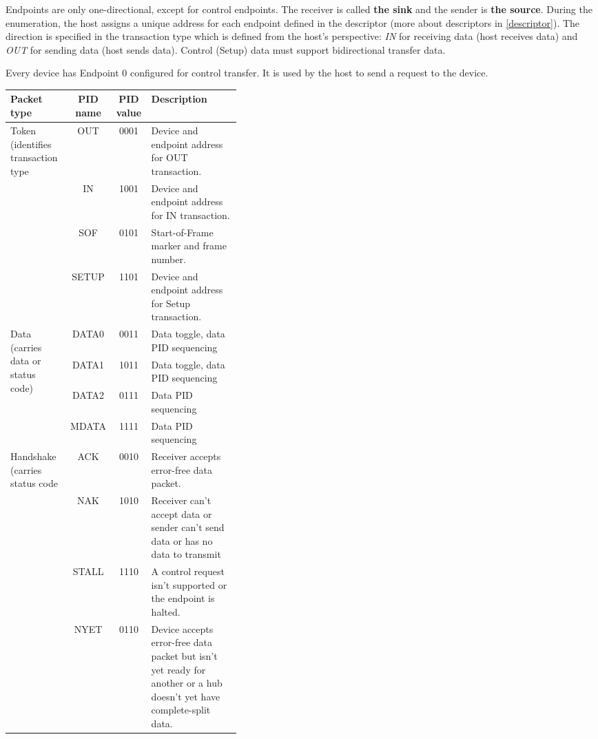 Endpoints are only one-directional, except for control endpoints. The receiver is called \textbf{the sink} and the sender is \textbf{the source}. During the enumeration, the host assigns a unique address for each endpoint defined in the descriptor (more about descriptors in \autoref{descriptor}). The direction is specified in the transaction type which is defined from the host's perspective: \emph{IN} for receiving data (host receives data) and \emph{OUT} for sending data (host sends data). Control (Setup) data must support bidirectional transfer data.

Every device has Endpoint 0 configured for control transfer. It is used by the host to send a request to the device.

\newpage
\begin{table}[ht]
    \centering
    \begin{tabular}{|l|c|c|p{0.39\linewidth}|} \hline
         \textbf{Packet type} & \textbf{PID name} & \textbf{PID value} & \textbf{Description} \\ \hline
         \multirow{4}{3cm}{Token (identifies transaction type} & OUT & 0001 & Device and endpoint address for OUT transaction. \\ \cline {2-4}
           & IN & 1001 & Device and endpoint address for IN transaction. \\ \cline{2-4}
           & SOF & 0101 & Start-of-Frame marker and frame number. \\ \cline{2-4}
           & SETUP & 1101 & Device and endpoint address for Setup transaction. \\ \hline
         \multirow{4}{3cm}{Data (carries data or status code)} & DATA0 & 0011 & Data toggle, data PID sequencing \\ \cline{2-4}
           & DATA1 & 1011 & Data toggle, data PID sequencing \\ \cline{2-4}
           & DATA2 & 0111 & Data PID sequencing \\ \cline{2-4}
           & MDATA & 1111 & Data PID sequencing \\ \hline
         \multirow{4}{3cm}{Handshake (carries status code} & ACK & 0010 & Receiver accepts error-free data packet. \\ \cline{2-4}
           & NAK & 1010 & Receiver can't accept data or sender can't send data or has no data to transmit \\ \cline{2-4}
           & STALL & 1110 & A control request isn't supported or the endpoint is halted. \\ \cline{2-4}
           & NYET & 0110 & Device accepts error-free data packet but isn't yet ready for another or a hub doesn't yet have complete-split data. \\ \hline

\end{tabular}
\end{table}
